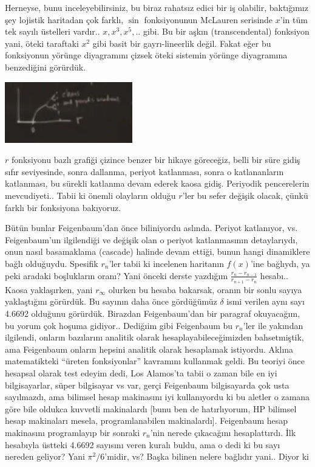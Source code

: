 \documentclass[12pt,fleqn]{article}\usepackage{../../common}
\begin{document}
Herneyse, bunu inceleyebilirsiniz, bu biraz rahatsız edici bir iş olabilir,
baktığımız şey lojistik haritadan çok farklı, $\sin$ fonksiyonunun McLauren
serisinde $x$'in tüm tek sayılı üstelleri vardır.. $x,x^3,x^5,..$ gibi. Bu bir
aşkın (transcendental) fonksiyon yani, öteki taraftaki $x^2$ gibi basit bir
gayrı-lineerlik değil. Fakat eğer bu fonksiyonun yörünge diyagramını çizsek
öteki sistemin yörünge diyagramına benzediğini görürdük.

\includegraphics[width=15em]{20_05.png}

$r$ fonksiyonu bazlı grafiği çizince benzer bir hikaye göreceğiz, belli bir süre
gidiş sıfır seviyesinde, sonra dallanma, periyot katlanması, sonra o
katlananların katlanması, bu sürekli katlanma devam ederek kaosa
gidiş. Periyodik pencerelerin mevcudiyeti.. Tabii ki önemli olayların olduğu
$r$'ler bu sefer değişik olacak, çünkü farklı bir fonksiyona bakıyoruz.

Bütün bunlar Feigenbaum'dan önce biliniyordu aslında. Periyot katlanıyor,
vs. Feigenbaum'un ilgilendiği ve değişik olan o periyot katlanmasının
detaylarıydı, onun nasıl basamaklama (cascade) halinde devam ettiği, bunun hangi
dinamiklere bağlı olduğuydu. Spesifik $r_n$'ler tabii ki incelenen haritanın
$f(x)$'ine bağlıydı, ya peki aradaki boşlukların oranı? Yani önceki derste
yazdığım $\frac{r_n - r_{n-1}}{r_{n+1} - r_n}$ hesabı.. Kaosa yaklaşırken, yani
$r_\infty$ olurken bu hesaba bakarsak, oranın bir sonlu sayıya yaklaştığını
görürdük. Bu sayının daha önce gördüğümüz $\delta$ ismi verilen aynı sayı 4.6692
olduğunu görürdük. Birazdan Feigenbaum'dan bir paragraf okuyacağım, bu yorum çok
hoşuma gidiyor.. Dediğıim gibi Feigenbaum bu $r_n$'ler ile yakından ilgilendi,
onların bazılarını analitik olarak hesaplayabileceğimizden bahsetmiştik, ama
Feigenbaum onların hepsini analitik olarak hesaplamak istiyordu. Aklına
matematikteki ``üreten fonksiyonlar'' kavramını kullanmak geldi. Bu teoriyi önce
hesapsal olarak test edeyim dedi, Los Alamos'ta tabii o zaman bile en iyi
bilgisayarlar, süper bilgisayar vs var, gerçi Feigenbaum bilgisayarda çok usta
sayılmazdı, ama bilimsel hesap makinasını iyi kullanıyordu ki bu aletler o
zamana göre bile oldukca kuvvetli makinalardı [bunu ben de hatırlıyorum, HP
  bilimsel hesap makinaları mesela, programlanabilen makinalardı].  Feigenbaum
hesap makinasını programlayıp bir sonraki $r_n$'nin nerede çıkacağını
hesaplattırdı. İlk hesabıyla üstteki 4.6692 sayısını veren kuralı buldu, ama o
dedi ki bu sayı nereden geliyor? Yani $\pi^2 / 6$'midir, vs? Başka bilinen
nelere bağlıdır yani.. Diyor ki
\end{document}
